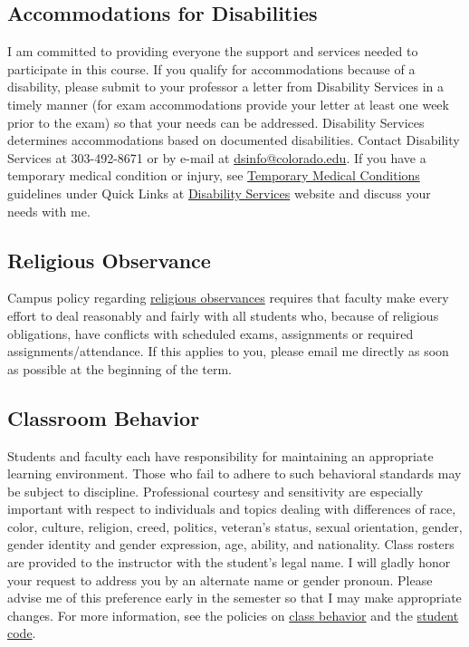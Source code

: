 \documentclass[10pt]{memoir}
\begin{document}
\subsection{Accommodations for Disabilities}
I am committed to providing everyone the support and services needed to participate in this course. If you qualify for accommodations because of a disability, please submit to your professor a letter from Disability Services in a timely manner (for exam accommodations provide your letter at least one week prior to the exam) so that your needs can be addressed. Disability Services determines accommodations based on documented disabilities. Contact Disability Services at 303-492-8671 or by e-mail at \href{mailto:dsinfo@colorado.edu}{dsinfo@colorado.edu}. If you have a temporary medical condition or injury, see \href{http://www.colorado.edu/disabilityservices/students/temporary-medical-conditions}{Temporary Medical Conditions} guidelines under Quick Links at \href{http://www.colorado.edu/disabilityservices/students}{Disability Services} website and discuss your needs with me.

\subsection{Religious Observance}
Campus policy regarding \href{http://www.colorado.edu/policies/observance-religious-holidays-and-absences-classes-andor-exams}{religious observances} requires that faculty make every effort to deal reasonably and fairly with all students who, because of religious obligations, have conflicts with scheduled exams, assignments or required assignments/attendance. If this applies to you, please email me directly as soon as possible at the beginning of the term. 

\subsection{Classroom Behavior}
Students and faculty each have responsibility for maintaining an appropriate learning environment. Those who fail to adhere to such behavioral standards may be subject to discipline. Professional courtesy and sensitivity are especially important with respect to individuals and topics dealing with differences of race, color, culture, religion, creed, politics, veteran’s status, sexual orientation, gender, gender identity and gender expression, age, ability, and nationality.  Class rosters are provided to the instructor with the student's legal name. I will gladly honor your request to address you by an alternate name or gender pronoun. Please advise me of this preference early in the semester so that I may make appropriate changes. For more information, see the policies on \href{http://www.colorado.edu/policies/student-classroom-and-course-related-behavior}{class behavior} and the \href{http://www.colorado.edu/osc/#student_code}{student code}.
\end{document}
